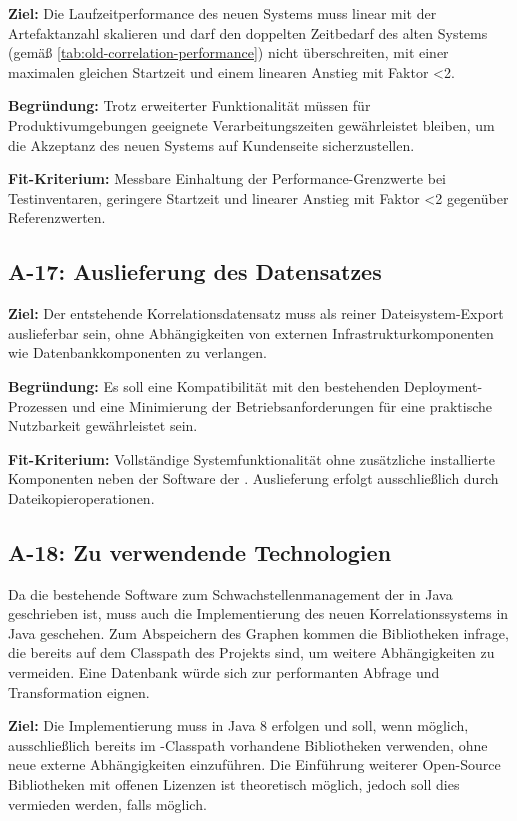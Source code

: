 \textbf{Ziel:}
Die Laufzeitperformance des neuen Systems muss linear mit der Artefaktanzahl skalieren und darf den doppelten Zeitbedarf des alten Systems (gemäß \autoref{tab:old-correlation-performance}) nicht überschreiten, mit einer maximalen gleichen Startzeit und einem linearen Anstieg mit Faktor <2.

\textbf{Begründung:}
Trotz erweiterter Funktionalität müssen für Produktivumgebungen geeignete Verarbeitungszeiten gewährleistet bleiben, um die Akzeptanz des neuen Systems auf Kundenseite sicherzustellen.

\textbf{Fit-Kriterium:}
Messbare Einhaltung der Performance-Grenzwerte bei Testinventaren, geringere Startzeit und linearer Anstieg mit Faktor <2 gegenüber Referenzwerten.

\subsection{A-17: Auslieferung des Datensatzes}\label{subsec:req-correlation-data-delivery}

\textbf{Ziel:}
Der entstehende Korrelationsdatensatz muss als reiner Dateisystem-Export auslieferbar sein, ohne Abhängigkeiten von externen Infrastrukturkomponenten wie Datenbankkomponenten zu verlangen.

\textbf{Begründung:}
Es soll eine Kompatibilität mit den bestehenden Deployment-Prozessen und eine Minimierung der Betriebsanforderungen für eine praktische Nutzbarkeit gewährleistet sein.

\textbf{Fit-Kriterium:}
Vollständige Systemfunktionalität ohne zusätzliche installierte Komponenten neben der Software der \metaeffekt.
Auslieferung erfolgt ausschließlich durch Dateikopieroperationen.

\subsection{A-18: Zu verwendende Technologien}\label{subsec:req-lang-java}

Da die bestehende Software zum Schwachstellenmanagement der \metaeffektsp in Java geschrieben ist, muss auch die Implementierung des neuen Korrelationssystems in Java geschehen.
Zum Abspeichern des Graphen kommen die Bibliotheken infrage, die bereits auf dem Classpath des Projekts sind, um weitere Abhängigkeiten zu vermeiden.
Eine Datenbank würde sich zur performanten Abfrage und Transformation eignen.

\textbf{Ziel:}
Die Implementierung muss in Java 8 erfolgen und soll, wenn möglich, ausschließlich bereits im \metaeffekt-Classpath vorhandene Bibliotheken verwenden, ohne neue externe Abhängigkeiten einzuführen.
Die Einführung weiterer Open-Source Bibliotheken mit offenen Lizenzen ist theoretisch möglich, jedoch soll dies vermieden werden, falls möglich.

